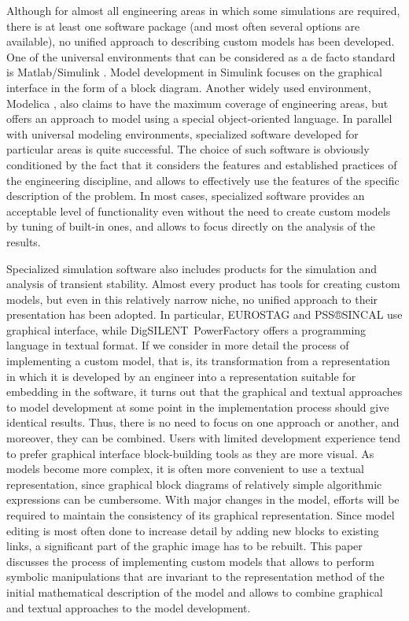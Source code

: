 \documentclass[lettersize,journal]{IEEEtran}
\begin{document}
Although for almost all engineering areas in which some simulations are required, there is at least one software package 
(and most often several options are available),  no unified approach to describing custom models has been developed. 
One of the universal environments that can be considered as a de facto standard is Matlab/Simulink \cite{texbook}. Model development in Simulink 
focuses on the graphical interface in the form of a block diagram. Another widely used environment, Modelica \cite{texbook}, also claims to have 
the maximum coverage of engineering areas, but offers an approach to model using a special object-oriented language. 
In parallel with universal modeling environments, specialized software developed for particular areas is quite successful. 
The choice of such software is obviously conditioned by the fact that it considers the features and established practices of the engineering discipline, 
and allows to effectively use the features of the specific description of the problem. In most cases, specialized software 
provides an acceptable level of functionality even without the need to create custom models by tuning of built-in ones, and allows 
to focus directly on the analysis of the results.

Specialized simulation software also includes products for the simulation and analysis of transient stability.
Almost every product has tools for creating custom models, but even in this relatively narrow niche, no unified approach to their presentation 
has been adopted. In particular, EUROSTAG \cite{texbook} and PSS®SINCAL \cite{texbook} use graphical interface, while \mbox{DigSILENT PowerFactory} \cite{texbook} offers a programming language in textual format.
If we consider in more detail the process of implementing a custom model, that is, its transformation from a representation in which 
it is developed by an engineer into a representation suitable for embedding in the software, it turns out that the graphical and textual approaches 
to model development at some point in the implementation process should give identical results. Thus, there is no need to focus on one approach or another,
and moreover, they can be combined. Users with limited development experience tend to prefer graphical interface block-building tools as they are more visual. 
As models become more complex, it is often more convenient to use a textual representation, since graphical block diagrams of relatively simple algorithmic 
expressions can be cumbersome. With major changes in the model, efforts will be required to maintain the consistency of its graphical representation. 
Since model editing is most often done to increase detail by adding new blocks to existing links, a significant part of the graphic image has to be rebuilt.
This paper discusses the process of implementing custom models that allows to perform symbolic manipulations that are invariant to the representation method
of the initial mathematical description of the model and allows to combine graphical and textual approaches to the model development.
\end{document}
